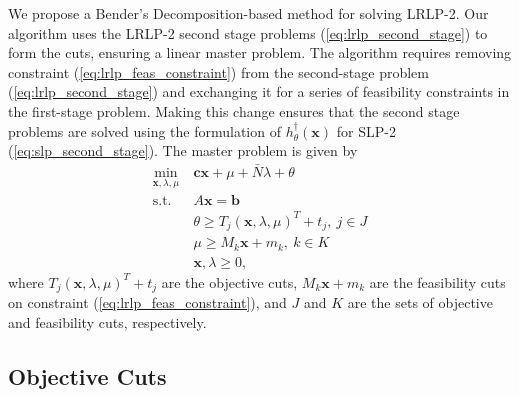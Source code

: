 \documentclass[11pt]{article}
\newcommand{\x}{\mathbf{x}}
\renewcommand{\c}{\mathbf{c}}
\renewcommand{\b}{\mathbf{b}}
\newcommand{\st}{\mbox{s.t.}}
\begin{document}
We propose a Bender's Decomposition-based method for solving LRLP-2.  Our algorithm uses the LRLP-2 second stage problems (\ref{eq:lrlp_second_stage}) to form the cuts, ensuring a linear master problem.  The algorithm requires removing constraint (\ref{eq:lrlp_feas_constraint}) from the second-stage problem (\ref{eq:lrlp_second_stage}) and exchanging it for a series of feasibility constraints in the first-stage problem.  Making this change ensures that the second stage problems are solved using the formulation of $h^\dagger_\theta(\x)$ for SLP-2 (\ref{eq:slp_second_stage}).  The master problem is given by
\begin{align}
	\min_{\x,\lambda,\mu} \ & \c\x + \mu + \bar{N}\lambda + \theta \label{eq:master_problem}\\
	\st \ & A\x = \b \nonumber \\
	& \theta \geq T_j (\x,\lambda,\mu)^T + t_j, \ j \in J \nonumber \\
	& \mu \geq M_k \x + m_k, \ k \in K \nonumber \\
	& \x,\lambda \geq 0, \nonumber
\end{align}
where $T_j (\x,\lambda,\mu)^T + t_j$ are the objective cuts, $M_k \x + m_k$ are the feasibility cuts on constraint (\ref{eq:lrlp_feas_constraint}), and $J$ and $K$ are the sets of objective and feasibility cuts, respectively.

\subsection{Objective Cuts}
\end{document}

